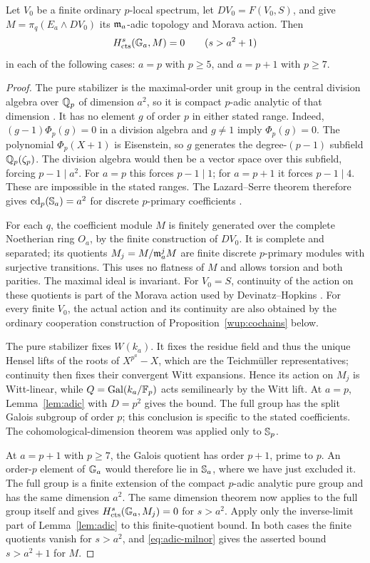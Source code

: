 \begin{proposition}\label{prop:cohomology}
Let $V_0$ be a finite ordinary $p$-local spectrum, let $DV_0=F(V_0,S)$,
and give $M=\pi_q(E_a\wedge DV_0)$ its $\mathfrak m_a$-adic topology and
Morava action. Then
\[
 H^s_{\operatorname{cts}}(\mathbb G_a,M)=0\qquad(s>a^2+1)
\]
in each of the following cases: $a=p$ with $p\geq5$, and $a=p+1$
with $p\geq7$.
\end{proposition}
\begin{proof}
The pure stabilizer is the maximal-order unit group in the central
division algebra over $\mathbb Q_p$ of dimension $a^2$, so it is compact
$p$-adic analytic of that dimension \cite[Sections~2.1--2.2]{morava1985}.
It has no element $g$ of order $p$ in either stated range. Indeed,
$(g-1)\Phi_p(g)=0$ in a division algebra and $g\ne1$ imply
$\Phi_p(g)=0$. The polynomial $\Phi_p(X+1)$ is Eisenstein, so $g$
generates the degree-$(p-1)$ subfield $\mathbb Q_p(\zeta_p)$. The division
algebra would then be a vector space over this subfield, forcing
$p-1\mid a^2$. For $a=p$ this forces $p-1\mid1$; for $a=p+1$ it
forces $p-1\mid4$. These are impossible in the stated ranges.
The Lazard--Serre theorem therefore gives
$\operatorname{cd}_p(\mathbb S_a)=a^2$ for discrete $p$-primary coefficients
\cite[Section~1, Corollary~(1)]{serre1965}.

For each $q$, the coefficient module $M$ is finitely generated over the
complete Noetherian ring $O_a$, by the finite construction of $DV_0$.
It is complete and separated; its quotients $M_j=M/\mathfrak m_a^jM$ are finite
discrete $p$-primary modules with surjective transitions. This uses no
flatness of $M$ and allows torsion and both parities. The maximal ideal
is invariant. For $V_0=S$, continuity of the action on these quotients
is part of the Morava action used by Devinatz--Hopkins
\cite[Theorem~1(ii) and Remark~1.3]{dh2004}. For every finite $V_0$,
the actual action and its continuity are also obtained by the ordinary
cooperation construction of Proposition~\ref{wup:cochains} below.

The pure stabilizer fixes $W(k_a)$. It fixes the residue field and thus
the unique Hensel lifts of the roots of $X^{p^a}-X$, which are the
Teichm\"uller representatives; continuity then fixes their convergent
Witt expansions. Hence its action on $M_j$ is Witt-linear, while
$Q=\operatorname{Gal}(k_a/\mathbb F_p)$ acts semilinearly by the Witt lift. At $a=p$,
Lemma~\ref{lem:adic} with $D=p^2$ gives the bound. The full group has
the split Galois subgroup of order $p$; this conclusion is specific to
the stated coefficients. The cohomological-dimension theorem was
applied only to $\mathbb S_p$.

At $a=p+1$ with $p\geq7$, the Galois quotient has order $p+1$, prime to $p$.
An order-$p$ element of $\mathbb G_a$ would therefore lie in $\mathbb S_a$, where
we have just excluded it. The full group is a finite extension of the
compact $p$-adic analytic pure group and has the same dimension $a^2$.
The same dimension theorem now applies to the full group itself and
gives $H^s_{\operatorname{cts}}(\mathbb G_a,M_j)=0$ for $s>a^2$. Apply only the
inverse-limit part of Lemma~\ref{lem:adic} to this finite-quotient
bound. In both cases the finite quotients vanish for $s>a^2$, and
\eqref{eq:adic-milnor} gives the asserted bound $s>a^2+1$ for $M$.
\end{proof}


